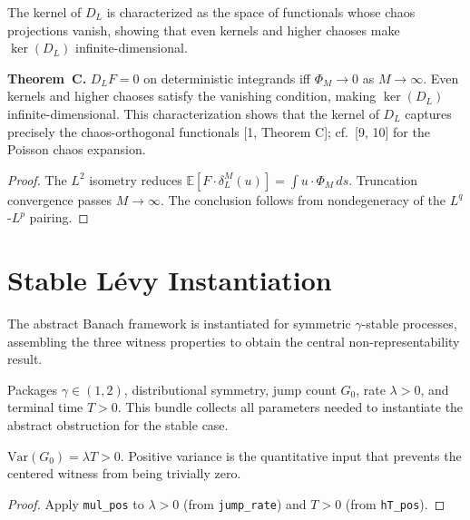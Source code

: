The kernel of $D_L$ is characterized as the space of functionals whose chaos projections vanish, showing that even kernels and higher chaoses make $\ker(D_L)$ infinite-dimensional.

\begin{theorem}\label{thm:chaos_char}
\leanok
{}
\textbf{Theorem~C.} $D_L F = 0$ on deterministic integrands iff $\Phi_M \to 0$ as $M \to \infty$.
Even kernels and higher chaoses satisfy the vanishing condition, making $\ker(D_L)$ infinite-dimensional.
This characterization shows that the kernel of $D_L$ captures precisely the chaos-orthogonal functionals [1, Theorem C]; cf.\ [9, 10] for the Poisson chaos expansion.
\end{theorem}
\begin{proof}\leanok The $L^2$ isometry reduces $\mathbb{E}[F \cdot \delta_L^M(u)] = \int u \cdot \Phi_M\,ds$. Truncation convergence passes $M \to \infty$. The conclusion follows from nondegeneracy of the $L^q$-$L^p$ pairing.\end{proof}

\section{Stable Lévy Instantiation}

The abstract Banach framework is instantiated for symmetric $\gamma$-stable processes, assembling the three witness properties to obtain the central non-representability result.

\begin{defn}\label{def:stable_noise}
\leanok
{}
Packages $\gamma \in (1,2)$, distributional symmetry, jump count $G_0$, rate $\lambda > 0$,
and terminal time $T > 0$.
This bundle collects all parameters needed to instantiate the abstract obstruction for the stable case.
\end{defn}

\begin{theorem}\label{thm:var_pos}
\leanok
{}
$\mathrm{Var}(G_0) = \lambda T > 0$.
Positive variance is the quantitative input that prevents the centered witness from being trivially zero.
\end{theorem}
\begin{proof}\leanok Apply \texttt{mul\_pos} to $\lambda > 0$ (from \texttt{jump\_rate}) and $T > 0$ (from \texttt{hT\_pos}).\end{proof}

